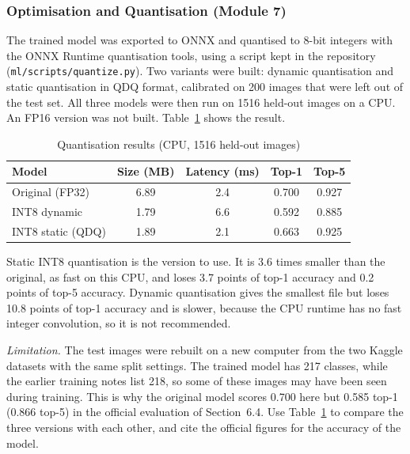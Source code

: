\subsubsection{Optimisation and Quantisation (Module 7)}
The trained model was exported to ONNX and quantised to 8-bit integers with the
ONNX Runtime quantisation tools, using a script kept in the repository
(\texttt{ml/scripts/quantize.py}). Two variants were built: dynamic quantisation
and static quantisation in QDQ format, calibrated on 200 images that were left out
of the test set. All three models were then run on 1516 held-out images on a CPU.
An FP16 version was not built. Table~\ref{tab:quant} shows the result.

\begin{table}[h]
\centering
\caption{Quantisation results (CPU, 1516 held-out images)}
\label{tab:quant}
\begin{tabular}{|l|c|c|c|c|}
\hline
\textbf{Model} & \textbf{Size (MB)} & \textbf{Latency (ms)} & \textbf{Top-1} & \textbf{Top-5} \\
\hline
Original (FP32)      & 6.89 & 2.4 & 0.700 & 0.927 \\
INT8 dynamic         & 1.79 & 6.6 & 0.592 & 0.885 \\
INT8 static (QDQ)    & 1.89 & 2.1 & 0.663 & 0.925 \\
\hline
\end{tabular}
\end{table}

Static INT8 quantisation is the version to use. It is 3.6 times smaller than the
original, as fast on this CPU, and loses 3.7 points of top-1 accuracy and 0.2 points
of top-5 accuracy. Dynamic quantisation gives the smallest file but loses 10.8
points of top-1 accuracy and is slower, because the CPU runtime has no fast
integer convolution, so it is not recommended.

\textit{Limitation.} The test images were rebuilt on a new computer from the two
Kaggle datasets with the same split settings. The trained model has 217 classes,
while the earlier training notes list 218, so some of these images may have been
seen during training. This is why the original model scores 0.700 here but 0.585
top-1 (0.866 top-5) in the official evaluation of Section~6.4. Use Table~\ref{tab:quant}
to compare the three versions with each other, and cite the official figures for the
accuracy of the model.


